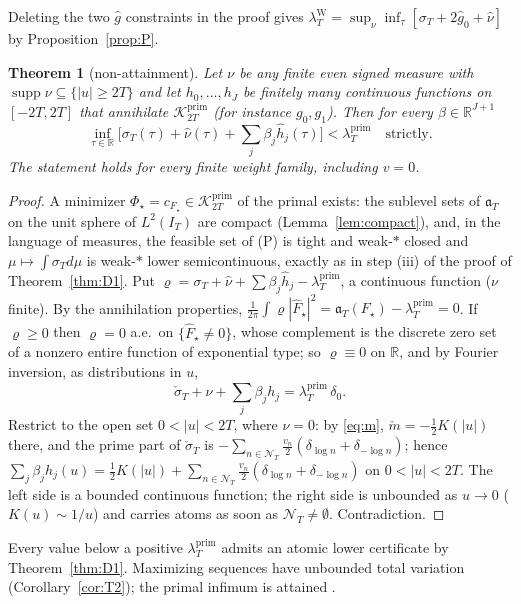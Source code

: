 \documentclass[10pt]{amsart}
\newtheorem{theorem}{Theorem}[section]
\theoremstyle{definition}
\theoremstyle{remark}
\newcommand{\R}{\mathbb R}
\newcommand{\supp}{\operatorname{supp}}
\newcommand{\Kp}{\mathcal K^{\mathrm{prim}}_{2T}}
\newcommand{\IT}{I_T}
\newcommand{\lamP}{\lambda^{\mathrm{prim}}_T}
\newcommand{\lamW}{\lambda^{\mathrm W}_T}
\newcommand{\sT}{\sigma_T}
\newcommand{\gh}[1]{\widehat g_{#1}}
\newcommand{\nuh}{\widehat\nu}
\newcommand{\Fh}{\widehat F}
\newcommand{\NT}{\mathcal N_T}
\begin{document}
Deleting the two $\widehat g$ constraints in the proof gives
$\lamW=\sup_\nu\inf_\tau[\sT+2\gh0+\nuh]$ by Proposition~\ref{prop:P}.


\begin{theorem}[non-attainment]\label{thm:O}
Let $\nu$ be any finite even signed measure with $\supp\nu\subseteq\{|u|\ge2T\}$ and let
$h_0,\dots,h_J$ be finitely many continuous functions on $[-2T,2T]$ that annihilate $\Kp$
(for instance $g_0,g_1$). Then for every $\beta\in\R^{J+1}$
\[
\inf_{\tau\in\R}\Big[\sT(\tau)+\nuh(\tau)+\sum_j\beta_j\widehat h_j(\tau)\Big]<\lamP\quad\text{strictly.}
\]
The statement holds for every finite weight family, including $v=0$.
\end{theorem}
\begin{proof}
A minimizer $\Phi_\star=c_{F_\star}\in\Kp$ of the primal exists: the sublevel sets of
$\mathfrak a_T$ on the unit sphere of $L^2(\IT)$ are compact (Lemma~\ref{lem:compact}),
and, in the language of measures, the feasible set of (P) is tight and weak-$*$ closed and $\mu\mapsto\int\sT d\mu$ is
weak-$*$ lower semicontinuous, exactly as in step (iii) of the proof of Theorem~\ref{thm:D1}. Put $\varrho=\sT+\nuh+\sum\beta_j\widehat h_j-\lamP$, a
continuous function ($\nu$ finite). By the annihilation properties,
$\frac1{2\pi}\int\varrho|\Fh_\star|^2=\mathfrak a_T(F_\star)-\lamP=0$. If $\varrho\ge0$ then $\varrho=0$ a.e.\ on
$\{\Fh_\star\ne0\}$, whose complement is the discrete zero set of a nonzero entire function of
exponential type; so $\varrho\equiv0$ on $\R$, and by Fourier inversion, as distributions in $u$,
\[
\check\sT+\nu+\sum_j\beta_jh_j=\lamP\,\delta_0 .
\]
Restrict to the open set $0<|u|<2T$, where $\nu=0$: by \eqref{eq:m}, $\check m=-\frac12K(|u|)$
there, and the prime part of $\check\sT$ is $-\sum_{n\in\NT}\frac{v_n}2(\delta_{\log n}+\delta_{-\log n})$;
hence $\sum_j\beta_jh_j(u)=\frac12K(|u|)+\sum_{n\in\NT}\frac{v_n}2(\delta_{\log n}+\delta_{-\log n})$
on $0<|u|<2T$. The left side is a bounded continuous function; the right side is unbounded as
$u\to0$ ($K(u)\sim1/u$) and carries atoms as soon as $\NT\neq\emptyset$. Contradiction.
\end{proof}

Every value below a positive $\lamP$ admits an atomic lower
certificate by Theorem~\ref{thm:D1}. Maximizing sequences have
unbounded total variation (Corollary~\ref{cor:T2}); the primal
infimum is attained \cite[Thm.~3]{Bombieri2000}.
\end{document}
